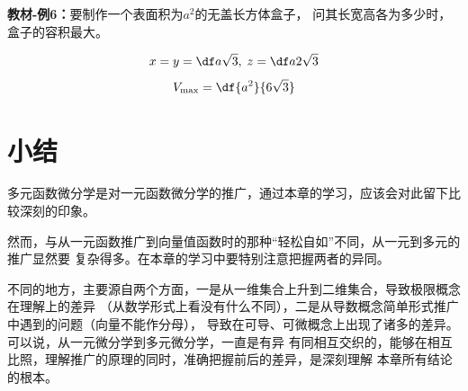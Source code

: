 \begin{center}
\end{center}

{\bf 教材-例6：}要制作一个表面积为$a^2$的无盖长方体盒子，
问其长宽高各为多少时，盒子的容积最大。

$$x=y=\df a{\sqrt 3},\;z=\df a{2\sqrt3}$$
$$V_{\max}=\df{a^2}{6\sqrt 3}$$

\section{小结}

多元函数微分学是对一元函数微分学的推广，通过本章的学习，应该会对此留下比较深刻的印象。

然而，与从一元函数推广到向量值函数时的那种“轻松自如”不同，从一元到多元的推广显然要
复杂得多。在本章的学习中要特别注意把握两者的异同。

不同的地方，主要源自两个方面，一是从一维集合上升到二维集合，导致极限概念在理解上的差异
（从数学形式上看没有什么不同），二是从导数概念简单形式推广中遇到的问题（向量不能作分母），
导致在可导、可微概念上出现了诸多的差异。可以说，从一元微分学到多元微分学，一直是有异
有同相互交织的，能够在相互比照，理解推广的原理的同时，准确把握前后的差异，是深刻理解
本章所有结论的根本。

